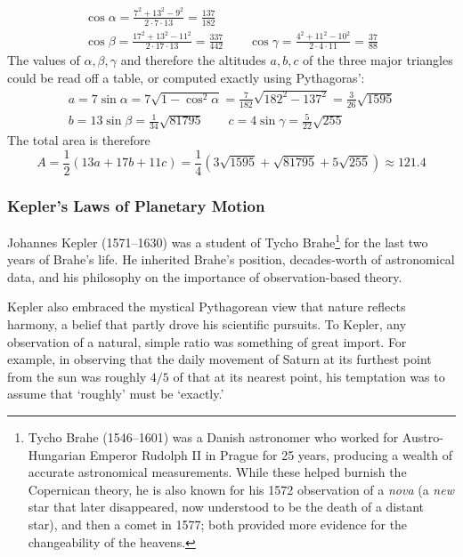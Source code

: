 \begin{gather*}
	\cos\alpha=\frac{7^2+13^2-9^2}{2\cdot 7\cdot 13} =\frac{137}{182}\\[5pt]
	\cos\beta=\frac{17^2+13^2-11^2}{2\cdot 17\cdot 13} =\frac{337}{442}
	\qquad
	\cos\gamma=\frac{4^2+11^2-10^2}{2\cdot 4\cdot 11} =\frac{37}{88}
\end{gather*}
The values of $\alpha,\beta,\gamma$ and therefore the altitudes $a,b,c$ of the three major triangles could be read off a table, or computed exactly using Pythagoras':
\begin{gather*}
	a=7\sin\alpha=7\sqrt{1-\cos^2\alpha}=\frac 7{182}\sqrt{182^2-137^2} =\frac 3{26}\sqrt{1595}\\
	b=13\sin\beta=\frac{1}{34}\sqrt{81795}\qquad c=4\sin\gamma =\frac 5{22}\sqrt{255}
\end{gather*}
The total area is therefore
\[
	A=\frac 12(13a+17b+11c)=\frac 14\left(3\sqrt{1595} + \sqrt{81795} + 5\sqrt{255}\right) \approx 121.4
\]


\pagebreak[3]


\subsubsection*{Kepler's Laws of Planetary Motion}\label{pg:keplerslaws}

Johannes Kepler (1571--1630) was a student of Tycho Brahe\footnote{%
	Tycho Brahe (1546--1601) was a Danish astronomer who worked for Austro-Hungarian Emperor Rudolph II in Prague for 25 years, producing a wealth of accurate astronomical measurements. While these helped burnish the Copernican theory, he is also known for his 1572 observation of a \emph{nova} (a \emph{new} star that later disappeared, now understood to be the death of a distant star), and then a comet in 1577; both provided more evidence for the changeability of the heavens.%
}
for the last two years of Brahe's life. He inherited Brahe's position, decades-worth of astronomical data, and his philosophy on the importance of observation-based theory.
\smallbreak

Kepler also embraced the mystical Pythagorean view that nature reflects harmony, a belief that partly drove his scientific pursuits. To Kepler, any observation of a natural, simple ratio was something of great import. For example, in observing that the daily movement of Saturn at its furthest point from the sun was roughly $4/5$ of that at its nearest point, his temptation was to assume that `roughly' must be `exactly.'
\smallbreak

